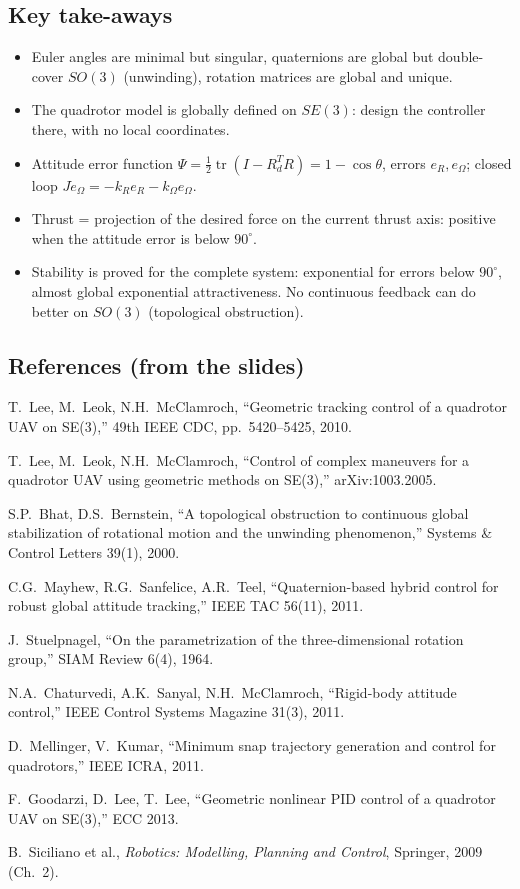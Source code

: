 \documentclass[11pt,a4paper]{article}
\newcommand{\tr}{\operatorname{tr}}
\newcommand{\eR}{e_R}
\newcommand{\eO}{e_\Omega}
\theoremstyle{definition}
\theoremstyle{plain}
\theoremstyle{remark}
\begin{document}
\subsection{Key take-aways}

\begin{itemize}
  \item Euler angles are minimal but singular, quaternions are global but double-cover $SO(3)$ (unwinding), rotation matrices are global and unique.
  \item The quadrotor model is globally defined on $SE(3)$: design the controller there, with no local coordinates.
  \item Attitude error function $\Psi=\tfrac12\tr(I-R_d^TR)=1-\cos\theta$, errors $\eR,\eO$; closed loop $J\dot\eO=-k_R\eR-k_\Omega\eO$.
  \item Thrust = projection of the desired force on the current thrust axis: positive when the attitude error is below $90^\circ$.
  \item Stability is proved for the complete system: exponential for errors below $90^\circ$, almost global exponential attractiveness. No continuous feedback can do better on $SO(3)$ (topological obstruction).
\end{itemize}

\subsection*{References (from the slides)}
\begin{enumerate}[label={[\arabic*]},nosep]
  \item T.~Lee, M.~Leok, N.H.~McClamroch, ``Geometric tracking control of a quadrotor UAV on SE(3),'' 49th IEEE CDC, pp.~5420--5425, 2010.
  \item T.~Lee, M.~Leok, N.H.~McClamroch, ``Control of complex maneuvers for a quadrotor UAV using geometric methods on SE(3),'' arXiv:1003.2005.
  \item S.P.~Bhat, D.S.~Bernstein, ``A topological obstruction to continuous global stabilization of rotational motion and the unwinding phenomenon,'' Systems \& Control Letters 39(1), 2000.
  \item C.G.~Mayhew, R.G.~Sanfelice, A.R.~Teel, ``Quaternion-based hybrid control for robust global attitude tracking,'' IEEE TAC 56(11), 2011.
  \item J.~Stuelpnagel, ``On the parametrization of the three-dimensional rotation group,'' SIAM Review 6(4), 1964.
  \item N.A.~Chaturvedi, A.K.~Sanyal, N.H.~McClamroch, ``Rigid-body attitude control,'' IEEE Control Systems Magazine 31(3), 2011.
  \item D.~Mellinger, V.~Kumar, ``Minimum snap trajectory generation and control for quadrotors,'' IEEE ICRA, 2011.
  \item F.~Goodarzi, D.~Lee, T.~Lee, ``Geometric nonlinear PID control of a quadrotor UAV on SE(3),'' ECC 2013.
  \item B.~Siciliano et al., \emph{Robotics: Modelling, Planning and Control}, Springer, 2009 (Ch.~2).
\end{enumerate}
\end{document}
